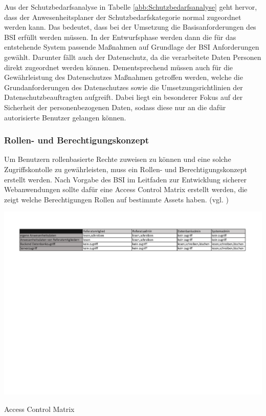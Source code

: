 Aus der Schutzbedarfsanalyse in Tabelle \ref{abb:Schutzbedarfsanalyse} geht hervor, dass der Anwesenheitsplaner der Schutzbedarfskategorie normal zugeordnet werden kann. Das bedeutet, dass bei der Umsetzung die Basisanforderungen des BSI erfüllt werden müssen. In der Entwurfsphase werden dann die für das entstehende System passende Maßnahmen auf Grundlage der BSI Anforderungen gewählt. Darunter fällt auch der Datenschutz, da die verarbeitete Daten Personen direkt zugeordnet werden können. Dementsprechend müssen auch für die Gewährleistung des Datenschutzes Maßnahmen getroffen werden, welche die Grundanforderungen des Datenschutzes sowie die Umsetzungsrichtlinien der Datenschutzbeauftragten aufgreift. Dabei liegt ein besonderer Fokus auf der Sicherheit der personenbezogenen Daten, sodass diese nur an die dafür autorisierte Benutzer gelangen können.

\subsubsection{Rollen- und Berechtigungskonzept}
\label{sec:RollenBerechtigungskonzept}
Um Benutzern rollenbasierte Rechte zuweisen zu können und eine solche Zugriffskontolle zu gewährleisten, muss ein Rollen- und Berechtigungskonzept erstellt werden. Nach Vorgabe des BSI im Leitfaden zur Entwicklung sicherer Webanwendungen sollte dafür eine Access Control Matrix erstellt werden, die zeigt welche Berechtigungen Rollen auf bestimmte Assets haben. (vgl. \cite[S.26]{BSIWeb})

\begin{table}[htbp]
    \centering
    \includegraphics[width=1\textwidth,angle=0]{abb/Berechtigungsmatrix.pdf}
    \caption[Beschreibung]{Access Control Matrix}
    \label{abb:AccessControlMatrix}
\end{table}

